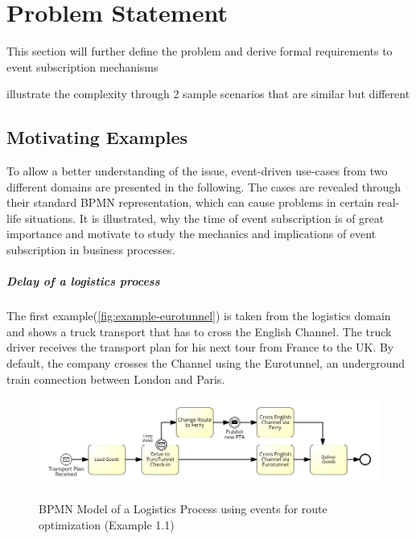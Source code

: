 \chapter{Problem Statement}\label{ch:problemstatement}

This section will further define the problem and derive formal requirements to event subscription mechanisms

illustrate the complexity through 2 sample scenarios that are similar but different

\section{Motivating Examples}\label{ch:motivatingexamples}

To allow a better understanding of the issue, event-driven use-cases from two different domains are presented in the following.
The cases are revealed through their standard BPMN representation, which can cause problems in certain real-life situations.
It is illustrated, why the time of event subscription is of great importance and motivate to study the mechanics and implications of event subscription in business processes.

\paragraph{Delay of a logistics process}
The first example(\autoref{fig:example-eurotunnel}) is taken from the logistics domain and shows a truck transport that has to cross the English Channel.
The truck driver receives the transport plan for his next tour from France to the UK. By default, the company crosses the Channel using the Eurotunnel, an underground train connection between London and Paris.

\begin{figure}[]
	\myfloatalign
	{\includegraphics[width=1\linewidth]{chapters/requirements/Eurotunnel-simplified.png}}
	\caption{BPMN Model of a Logistics Process using events for route optimization (Example 1.1)}
	\label{fig:example-eurotunnel}
\end{figure}

